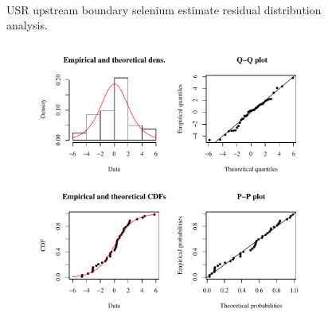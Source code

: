 \begin{landscape}
\begin{figure}
\begin{subfigure}{0.7\textwidth}
		\end{subfigure}\\
		\caption{USR upstream boundary selenium estimate residual distribution analysis.}
	\end{figure}
\end{landscape}

\subfiguretop
\begin{landscape}
	\begin{figure}
		\begin{subfigure}{0.7\textwidth}
			\centering
			\includegraphics[width=\tableCustomSize]{"Figures/Results_DSR/Stochastic/Conc Model res-fit D101C"}
		\end{subfigure}%
		\begin{subfigure}{0.7\textwidth}
			\centering

\end{subfigure}
\end{figure}
\end{landscape}
